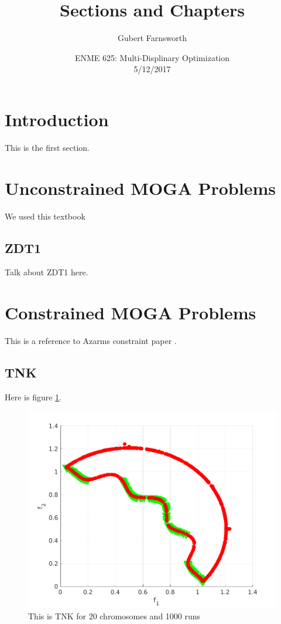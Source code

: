 \documentclass{article}
\title{Sections and Chapters}
\author{Gubert Farnsworth}
\date{ ENME 625: Multi-Displinary Optimization \\ 5/12/2017}
\begin{document}
 
\maketitle

\newpage
 
\tableofcontents
 
\newpage 
 
\section{Introduction}
 
This is the first section.
 

 
\section*{Unconstrained MOGA Problems}
We used this textbook \cite{deb2001multi}

\subsection{ ZDT1} 
Talk about ZDT1 here.  


\section{Constrained MOGA Problems}
This is a reference to Azarms constraint paper \cite{kurpati2002constraint}. %
 
\subsection{TNK}

Here is figure \ref{fig:TNK}.


\begin{figure}%
  \centering
  \includegraphics[width=0.50\columnwidth]{5_020_1000.png}
  \caption{ This is TNK for 20 chromosomes and 1000 runs}
  \label{fig:TNK}
\end{figure}
 
\end{document}
